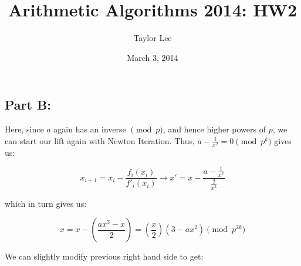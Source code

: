 \documentclass[12pt]{article}
\theoremstyle{moo}
\begin{document}
\fontseries {\seriesdefault}
\fontshape {\shapedefault}
\selectfont

\title{ Arithmetic Algorithms 2014: HW2}
\date{March 3, 2014}         %
\author{Taylor Lee}      %
\maketitle                      %



























\subsection*{Part B:}

Here, since $a$ again has an inverse $\pmod{p}$, and hence higher powers of $p$, we can start our lift again with Newton Iteration. Thus, $a - \frac{1}{x^2} = 0 \pmod{p^k}$ gives us:

\[
x_{i+1} =  x_i - \frac{f_i(x_i)}{f'_i(x_i)}  \rightarrow x' = x - \frac{a-\frac{1}{x^2}}{\frac{2}{x^3}}
\]

which in turn gives us:


\[

x = x - \left( \frac{ax^3 - x}{2} \right) = \left( \frac{x}{2} \right) \left( 3 - ax^2 \right) \pmod{p^{2k}}

\]

We can slightly modify previous right hand side to get:
\end{document}
